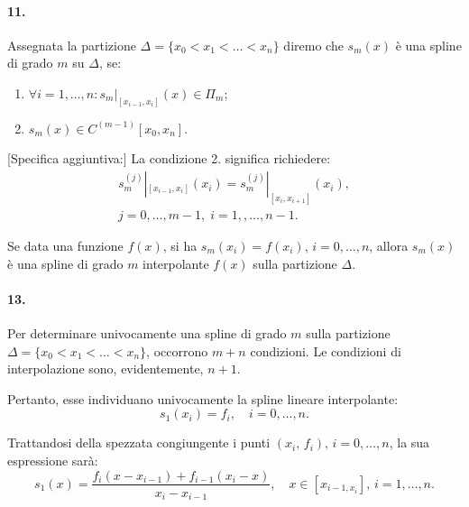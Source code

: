 \paragraph{11.} Assegnata la partizione $\Delta = \{x_0<x_1<\hdots<x_n\}$ diremo che $s_m(x)$ è una spline di grado $m$ su $\Delta$, se:
\begin{enumerate}
    \item $\forall i=1,\hdots,n : s_m|_{[x_{i-1},x_i]}(x)\in\Pi_m$;
    \item $s_m(x)\in C^{(m-1)}[x_0,x_n]$.
\end{enumerate}
[Specifica aggiuntiva:] La condizione 2. significa richiedere:
\begin{equation*}
    \begin{matrix}
        s_m^{(j)}|_{[x_{i-1},x_i]}(x_i)= s_m^{(j)}|_{[x_i,x_{i+1}]}(x_i),\\
        j=0,\hdots,m-1,\; i=1,,\hdots,n-1.
    \end{matrix}
\end{equation*}

\noindent [Aggiunta:] Se data una funzione $f(x)$, si ha $s_m(x_i)=f(x_i),\, i=0,\hdots,n$, allora $s_m(x)$ è una spline di grado $m$ interpolante $f(x)$ sulla partizione $\Delta$.

\paragraph{13.} Per determinare univocamente una spline di grado $m$ sulla partizione $\Delta=\{x_0<x_1<\hdots<x_n\}$, occorrono $m+n$ condizioni. Le condizioni di interpolazione sono, evidentemente, $n+1$.

\noindent Pertanto, esse individuano univocamente la spline lineare interpolante:
\begin{equation*}
    s_1(x_i)=f_i,\quad i=0,\hdots, n.
\end{equation*}

\noindent Trattandosi della spezzata congiungente i punti $(x_i,\, f_i),\, i=0,\hdots, n$, la sua espressione sarà:
\begin{equation*}
    s_1(x)=\frac{f_i(x-x_{i-1})+f_{i-1}(x_i-x)}{x_i-x_{i-1}},\quad x\in[x_{i-1, x_i}],\, i = 1, \hdots, n.
\end{equation*}

